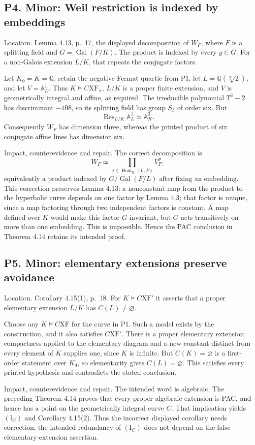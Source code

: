 \documentclass[10pt]{article}
\begin{document}
\subsection*{P4. Minor: Weil restriction is indexed by embeddings}
Location. Lemma 4.13, p. 17, the displayed decomposition of \(W_F\), where \(F\) is a splitting field and \(G=\operatorname{Gal}(F/K)\). The product is indexed by every \(g\in G\). For a non-Galois extension \(L/K\), that repeats the conjugate factors.\par
Let \(K_0=K=\mathbb Q\), retain the negative Fermat quartic from P1, let \(L=\mathbb Q(\sqrt[3]{2})\), and let \(V=\mathbb A^1_L\). Thus \(K\models C\mathrm{XF}_\forall\), \(L/K\) is a proper finite extension, and \(V\) is geometrically integral and affine, as required. The irreducible polynomial \(T^3-2\) has discriminant \(-108\), so its splitting field has group \(S_3\) of order six. But \[\operatorname{Res}_{L/K}\mathbb A^1_L\simeq\mathbb A^3_K.\] Consequently \(W_F\) has dimension three, whereas the printed product of six conjugate affine lines has dimension six.\par
Impact, counterevidence and repair. The correct decomposition is \[W_F\simeq\prod_{\sigma\in\operatorname{Hom}_K(L,F)} V^\sigma_F,\] equivalently a product indexed by \(G/\operatorname{Gal}(F/L)\) after fixing an embedding. This correction preserves Lemma 4.13: a nonconstant map from the product to the hyperbolic curve depends on one factor by Lemma 4.3; that factor is unique, since a map factoring through two independent factors is constant. A map defined over \(K\) would make this factor \(G\)-invariant, but \(G\) acts transitively on more than one embedding. This is impossible. Hence the PAC conclusion in Theorem 4.14 retains its intended proof.\par
\subsection*{P5. Minor: elementary extensions preserve avoidance}
Location. Corollary 4.15(1), p. 18. For \(K\models C\mathrm{XF}'\) it asserts that a proper elementary extension \(L/K\) has \(C(L)\ne\varnothing\).\par
Choose any \(K\models C\mathrm{XF}\) for the curve in P1. Such a model exists by the construction, and it also satisfies \(C\mathrm{XF}'\). There is a proper elementary extension: compactness applied to the elementary diagram and a new constant distinct from every element of \(K\) supplies one, since \(K\) is infinite. But \(C(K)=\varnothing\) is a first-order statement over \(K_0\), so elementarity gives \(C(L)=\varnothing\). This satisfies every printed hypothesis and contradicts the stated conclusion.\par
Impact, counterevidence and repair. The intended word is algebraic. The preceding Theorem 4.14 proves that every proper algebraic extension is PAC, and hence has a point on the geometrically integral curve \(C\). That implication yields \((\mathrm I_C)\) and Corollary 4.15(2). Thus the incorrect displayed corollary needs correction; the intended redundancy of \((\mathrm I_C)\) does not depend on the false elementary-extension assertion.\par
\end{document}
